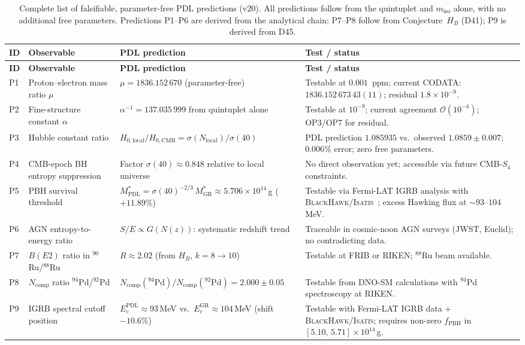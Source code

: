 \documentclass[11pt,a4paper]{article}
\theoremstyle{plain}
\theoremstyle{definition}
\theoremstyle{remark}
\begin{document}
\begin{longtable}{L{0.5cm}L{3.2cm}L{5.2cm}L{4.2cm}}
\caption{Complete list of falsifiable, parameter-free PDL predictions (v20). All predictions follow from the quintuplet and $m_{\mathrm{iso}}$ alone, with no additional free parameters. Predictions P1--P6 are derived from the analytical chain; P7--P8 follow from Conjecture~$H_B$ (D41); P9 is derived from D45.}
\label{tab:predictions}\\
\toprule
\textbf{ID} & \textbf{Observable} & \textbf{PDL prediction} & \textbf{Test / status}\\
\midrule
\endfirsthead
\toprule
\textbf{ID} & \textbf{Observable} & \textbf{PDL prediction} & \textbf{Test / status}\\
\midrule
\endhead
\bottomrule
\endfoot
P1 & Proton--electron mass ratio $\mu$ & $\mu=1836.152\,670$ (parameter-free) & Testable at $0.001$~ppm; current CODATA: $1836.152\,673\,43(11)$; residual $1.8\times10^{-9}$.\\[0.4em]
P2 & Fine-structure constant $\alpha$ & $\alpha^{-1}=137.035\,999$ from quintuplet alone & Testable at $10^{-9}$; current agreement $\mathcal{O}(10^{-4})$; OP3/OP7 for residual.\\[0.4em]
P3 & Hubble constant ratio & $H_{0,\mathrm{local}}/H_{0,\mathrm{CMB}}=\sigma(N_{\mathrm{local}})/\sigma(40)$ & PDL prediction $1.085935$ vs.\ observed $1.0859\pm0.007$; $0.006\%$ error; zero free parameters.\\[0.4em]
P4 & CMB-epoch BH entropy suppression & Factor $\sigma(40)\approx 0.848$ relative to local universe & No direct observation yet; accessible via future CMB-$S_4$ constraints.\\[0.4em]
P5 & PBH survival threshold & $M^*_{\mathrm{PDL}}=\sigma(40)^{-2/3}\,M^*_{\mathrm{GR}}\approx 5.706\times10^{14}$\,g ($+11.89\%$) & Testable via Fermi-LAT IGRB analysis with \textsc{BlackHawk}/\textsc{Isatis}~\cite{D45}; excess Hawking flux at $\sim93$--$104$\,MeV.\\[0.4em]
P6 & AGN entropy-to-energy ratio & $S/E\propto G(N(z))$: systematic redshift trend & Traceable in cosmic-noon AGN surveys (JWST, Euclid); no contradicting data.\\[0.4em]
P7 & $B(E2)$ ratio in $^{90}$Ru/$^{88}$Ru & $R\approx 2.02$ (from $H_B$, $k=8\to10$) & Testable at FRIB or RIKEN; $^{88}$Ru beam available.\\[0.4em]
P8 & $N_{\mathrm{comp}}$ ratio $^{94}$Pd/$^{92}$Pd & $N_{\mathrm{comp}}(^{94}\mathrm{Pd})/N_{\mathrm{comp}}(^{92}\mathrm{Pd})=2.000\pm0.05$ & Testable from DNO-SM calculations with $^{94}$Pd spectroscopy at RIKEN.\\[0.4em]
P9 & IGRB spectral cutoff position & $E_c^{\mathrm{PDL}} \approx 93$\,MeV vs.\ $E_c^{\mathrm{GR}} \approx 104$\,MeV (shift $-10.6\%$) & Testable with Fermi-LAT IGRB data + \textsc{BlackHawk}/\textsc{Isatis}; requires non-zero $f_{\mathrm{PBH}}$ in $[5.10,\,5.71]\times10^{14}$\,g.\\[0.4em]
\end{longtable}
\end{document}
